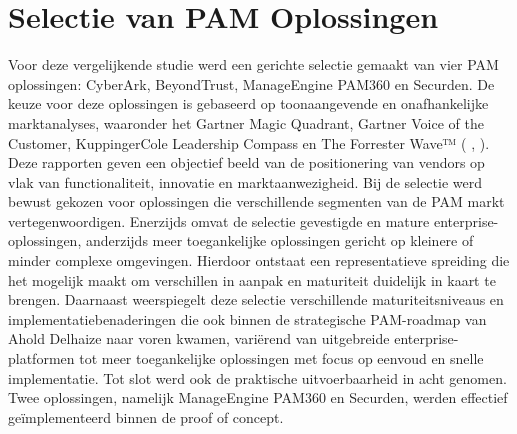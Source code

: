 \section{Selectie van PAM Oplossingen}
Voor deze vergelijkende studie werd een gerichte selectie gemaakt van vier PAM oplossingen: CyberArk, BeyondTrust, ManageEngine PAM360 en Securden.
De keuze voor deze oplossingen is gebaseerd op toonaangevende en onafhankelijke marktanalyses, waaronder het Gartner Magic Quadrant, Gartner Voice of the Customer, KuppingerCole Leadership Compass en The Forrester Wave™ (\cite{ForresterWavePIM2025} \cite{KuppingerColePAM2024}, \cite{GartnerMagicQuadrantPAM2025}). Deze rapporten geven een objectief beeld van de positionering van vendors op vlak van functionaliteit, innovatie en marktaanwezigheid.
Bij de selectie werd bewust gekozen voor oplossingen die verschillende segmenten van de PAM markt vertegenwoordigen. Enerzijds omvat de selectie gevestigde en mature enterprise-oplossingen, anderzijds meer toegankelijke oplossingen gericht op kleinere of minder complexe omgevingen. Hierdoor ontstaat een representatieve spreiding die het mogelijk maakt om verschillen in aanpak en maturiteit duidelijk in kaart te brengen.
Daarnaast weerspiegelt deze selectie verschillende maturiteitsniveaus en implementatiebenaderingen die ook binnen de strategische PAM-roadmap van Ahold Delhaize naar voren kwamen, variërend van uitgebreide enterprise-platformen tot meer toegankelijke oplossingen met focus op eenvoud en snelle implementatie.
Tot slot werd ook de praktische uitvoerbaarheid in acht genomen. Twee oplossingen, namelijk ManageEngine PAM360 en Securden, werden effectief geïmplementeerd binnen de proof of concept.

